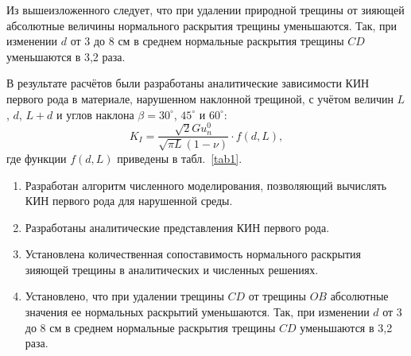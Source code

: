 Из вышеизложенного следует, что при удалении природной трещины от зияющей абсолютные величины нормального раскрытия трещины уменьшаются. 
Так, при изменении $d$ от 3 до 8 см в среднем нормальные раскрытия трещины $CD$ уменьшаются в 3,2 раза.

В результате расчётов были разработаны аналитические зависимости КИН первого рода в материале, нарушенном наклонной трещиной, с учётом величин  $L$, $d$, $L+d$ и углов наклона  $\beta=30^{\circ}$, $45^{\circ}$ и $60^{\circ}$:
\begin{displaymath}
K_{I}=\frac{\sqrt{2}Gu^{0}_{n}}{\sqrt{\pi L}(1-\nu)}\cdot f(d,L),
\end{displaymath}
где функции $f(d,L)$ приведены в табл.~\ref{tab1}.

\smallskip

\begin{enumerate}
	\item[1.] Разработан алгоритм численного моделирования, позволяющий вычислять КИН первого рода для нарушенной среды.
	\item[2.] Разработаны аналитические представления КИН первого рода.
	\item[3.] Установлена количественная сопоставимость нормального раскрытия зияющей трещины в аналитических и численных решениях.
  \item[4.] Установлено, что при удалении трещины $CD$ от трещины $OB$ абсолютные значения ее нормальных раскрытий уменьшаются. Так, при изменении $d$ от 3 до 8 см в среднем нормальные раскрытия трещины $CD$ уменьшаются в 3,2 раза.


\end{enumerate}	


